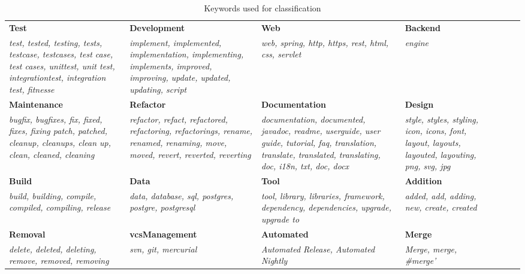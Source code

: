 \begin{table*}[]
\centering
\caption{Keywords used for classification}
\label{tab:keywords2}
\scriptsize
\begin{tabularx}{\textwidth}{XXXXXXXX}
\toprule
\textbf{Test} & \textbf{Development} & \textbf{Web} & \textbf{Backend} \\
\textit{test, tested, testing, tests, testcase, testcases, test case, test cases, unittest, unit test, integrationtest, integration test, fitnesse} & \textit{implement, implemented, implementation, implementing, implements, improved, improving, update, updated, updating, script} & \textit{web, spring, http, https, rest, html, css, servlet} & \textit{engine} \\
\textbf{Maintenance} & \textbf{Refactor} & \textbf{Documentation} & \textbf{Design} \\
\textit{bugfix, bugfixes, fix, fixed, fixes, fixing patch, patched, cleanup, cleanups, clean up, clean, cleaned, cleaning} & \textit{refactor, refact, refactored, refactoring, refactorings, rename, renamed, renaming, move, moved, revert, reverted, reverting} & \textit{documentation, documented, javadoc, readme, userguide, user guide, tutorial, faq, translation, translate, translated, translating, doc, i18n, txt, doc, docx} & \textit{style, styles, styling, icon, icons, font, layout, layouts, layouted, layouting, png, svg, jpg} \\
\textbf{Build} & \textbf{Data} & \textbf{Tool} & \textbf{Addition} \\
\textit{build, building, compile, compiled, compiling, release} & \textit{data, database, sql, postgres, postgre, postgresql} & \textit{tool, library, libraries, framework, dependency, dependencies, upgrade, upgrade to} & \textit{added, add, adding, new, create, created} \\
\textbf{Removal} & \textbf{vcsManagement} & \textbf{Automated} & \textbf{Merge} \\
\textit{delete, deleted, deleting, remove, removed, removing} & \textit{svn, git, mercurial} & \textit{Automated Release, Automated Nightly} & \textit{Merge, merge, \#merge'} \\ \bottomrule
\end{tabularx}
\end{table*}